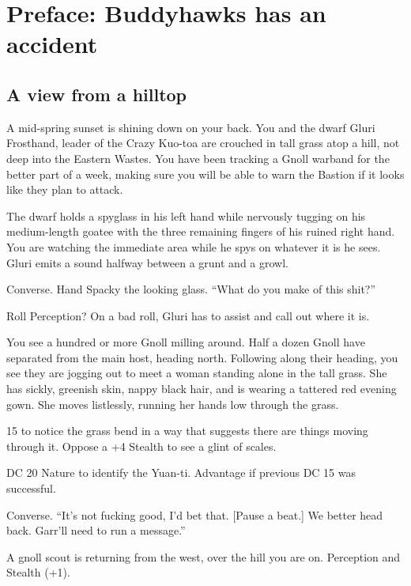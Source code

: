 \section{Preface: Buddyhawks has an accident}
\begin{multicols}{2}
\subsection{A view from a hilltop}
  \begin{aloud}
  A mid-spring sunset is shining down on your back.
  You and the dwarf Gluri Frosthand, leader of the Crazy Kuo-toa are crouched in tall grass atop
    a hill, not deep into the Eastern Wastes.
  You have been tracking a Gnoll warband for the better part of a week, making sure you will be
    able to warn the Bastion if it looks like they plan to attack.

  The dwarf holds a spyglass in his left hand while nervously tugging on his medium-length goatee
    with the three remaining fingers of his ruined right hand.
  You are watching the immediate area while he spys on whatever it is he sees.
  Gluri emits a sound halfway between a grunt and a growl.
  \end{aloud}

Converse.
Hand Spacky the looking glass.
``What do you make of this shit?''

Roll Perception?
On a bad roll, Gluri has to assist and call out where it is.

  \begin{aloud}
  You see a hundred or more Gnoll milling around.
  Half a dozen Gnoll have separated from the main host, heading north.
  Following along their heading, you see they are jogging out to meet a woman standing alone
    in the tall grass.
  She has sickly, greenish skin, nappy black hair, and is wearing a tattered red evening gown.
  She moves listlessly, running her hands low through the grass.
  \end{aloud}

15 to notice the grass bend in a way that suggests there are things moving through it.
Oppose a +4 Stealth to see a glint of scales.

DC 20 Nature to identify the Yuan-ti.
Advantage if previous DC 15 was successful.

Converse.
``It's not fucking good, I'd bet that.
[Pause a beat.]
We better head back.
Garr'll need to run a message.''

A gnoll scout is returning from the west, over the hill you are on.
Perception and Stealth (+1).
\end{multicols}

